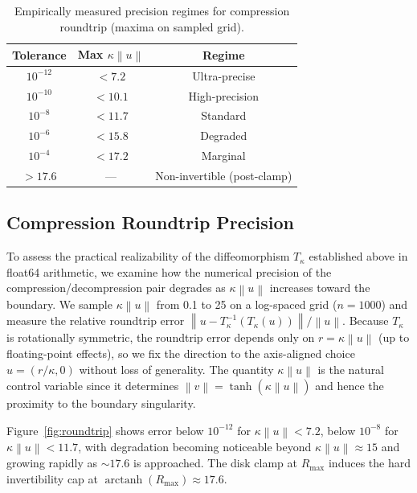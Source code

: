 \documentclass[11pt]{article}
\theoremstyle{plain}
\theoremstyle{definition}
\theoremstyle{remark}
\newcommand{\norm}[1]{\left\lVert #1 \right\rVert}
\begin{document}
\begin{table}[h]
\centering
\caption{Empirically measured precision regimes for compression roundtrip (maxima on sampled grid).}
\label{tab:precision}
\begin{tabular}{@{}ccc@{}}
\toprule
\textbf{Tolerance} & \textbf{Max $\kappa\norm{u}$} & \textbf{Regime} \\
\midrule
$10^{-12}$ & $< 7.2$ & Ultra-precise \\
$10^{-10}$ & $< 10.1$ & High-precision \\
$10^{-8}$ & $< 11.7$ & Standard \\
$10^{-6}$ & $< 15.8$ & Degraded \\
$10^{-4}$ & $< 17.2$ & Marginal \\
$> 17.6$ & --- & Non-invertible (post-clamp) \\
\bottomrule
\end{tabular}
\end{table}

\subsection{Compression Roundtrip Precision}
\label{sec:exp-roundtrip}

To assess the practical realizability of the diffeomorphism $T_\kappa$ established above in float64 arithmetic, we examine how the numerical precision of the compression/decompression pair degrades as $\kappa\norm{u}$ increases toward the boundary. We sample $\kappa\norm{u}$ from 0.1 to 25 on a log-spaced grid ($n=1000$) and measure the relative roundtrip error $\norm{u - T_\kappa^{-1}(T_\kappa(u))}/\norm{u}$. Because $T_\kappa$ is rotationally symmetric, the roundtrip error depends only on $r = \kappa\norm{u}$ (up to floating-point effects), so we fix the direction to the axis-aligned choice $u = (r/\kappa, 0)$ without loss of generality. The quantity $\kappa\norm{u}$ is the natural control variable since it determines $\norm{v} = \tanh(\kappa\norm{u})$ and hence the proximity to the boundary singularity.

Figure~\ref{fig:roundtrip} shows error below $10^{-12}$ for $\kappa\norm{u} < 7.2$, below $10^{-8}$ for $\kappa\norm{u} < 11.7$, with degradation becoming noticeable beyond $\kappa\norm{u} \approx 15$ and growing rapidly as $\sim 17.6$ is approached. The disk clamp at $R_{\max}$ induces the hard invertibility cap at $\operatorname{arctanh}(R_{\max}) \approx 17.6$.
\end{document}
